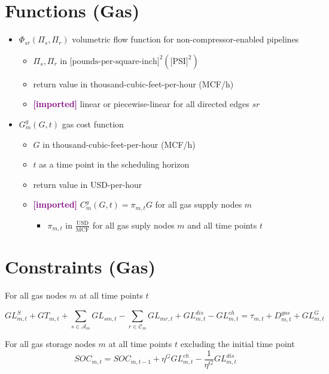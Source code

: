 \documentclass{article}
\newcommand{\imported}{\textcolor{purple}{\textbf{[imported] }}}
\def\sC{\mathcal C}
\def\sA{\mathcal A}
\begin{document}
\section{Functions (Gas)}
\begin{itemize}
\item $\Phi_{sr}(\Pi_s, \Pi_r)$ volumetric flow function for
  non-compressor-enabled pipelines
  \begin{itemize}
  \item $\Pi_s, \Pi_r$ in $\text{[pounds-per-square-inch]}^2 (\text{[PSI]}^2)$
  \item return value in thousand-cubic-feet-per-hour (MCF/h)
  \item \imported linear or piecewise-linear for all directed edges $sr$
  \end{itemize}

\item $G^g_m(G, t)$ gas cost function
  \begin{itemize}
  \item $G$ in thousand-cubic-feet-per-hour (MCF/h)
  \item $t$ as a time point in the scheduling horizon
  \item return value in USD-per-hour
  \item \imported $C_m^g(G, t) = \pi_{m,t} G$ for all gas supply nodes $m$
    \begin{itemize}
    \item $\pi_{m,t}$ in $\frac{\text{USD}}{\text{MCF}}$ for all gas suply nodes
      $m$ and all time points $t$
    \end{itemize}
  \end{itemize}
\end{itemize}



\section{Constraints (Gas)}
For all gas nodes $m$ at all time points $t$

\begin{equation}
  GL^S_{m,t} +
  GT_{m,t} + \sum_{s\in \sA_m}{GL_{sm,t}} - \sum_{r\in \sC_m}{GL_{mr,t}}
  + GL^{dis}_{m,t} - GL^{ch}_{m,t} =  \tau_{m,t} + D^{gas}_{m,t} + GL^G_{m,t}
\end{equation}

For all gas storage nodes $m$ at all time points $t$ excluding the initial time
point
\begin{equation}
  SOC_{m,t} = SOC_{m,t-1} + \eta^G GL^{ch}_{m,t} - \frac{1}{\eta^G} GL^{dis}_{m,t}
\end{equation}
\end{document}
